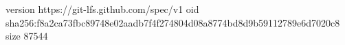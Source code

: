 version https://git-lfs.github.com/spec/v1
oid sha256:f8a2ca73fbc89748e02aadb7f4f274804d08a8774bd8d9b59112789e6d7020c8
size 87544
